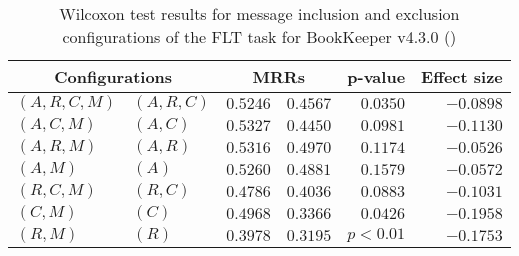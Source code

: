 
\begin{table}
\begin{spacing}{1.2}
\centering
\caption{Wilcoxon test results for message inclusion and exclusion configurations of the FLT task for BookKeeper v4.3.0 (\ctwo)}
\label{table:versus-wilcox-bookkeeper-flt-message}
\begin{tabular}{ll|rr|rr}
\toprule
      \multicolumn{2}{c|}{Configurations} &                \multicolumn{2}{c|}{MRRs} &        p-value & Effect size \\
\midrule
 $(A,R,C,M)$ &  $(A,R,C)$ &  $\bm{0.5246}$ &  $0.4567$ & $0.0350$ &   $-0.0898$ \\
   $(A,C,M)$ &    $(A,C)$ &  $\bm{0.5327}$ &  $0.4450$ & $0.0981$ &   $-0.1130$ \\
   $(A,R,M)$ &    $(A,R)$ &  $\bm{0.5316}$ &  $0.4970$ & $0.1174$ &   $-0.0526$ \\
     $(A,M)$ &      $(A)$ &  $\bm{0.5260}$ &  $0.4881$ & $0.1579$ &   $-0.0572$ \\
   $(R,C,M)$ &    $(R,C)$ &  $\bm{0.4786}$ &  $0.4036$ & $0.0883$ &   $-0.1031$ \\
     $(C,M)$ &      $(C)$ &  $\bm{0.4968}$ &  $0.3366$ & $0.0426$ &   $-0.1958$ \\
     $(R,M)$ &      $(R)$ &  $\bm{0.3978}$ &  $0.3195$ & $p<0.01$ &   $-0.1753$ \\
\bottomrule
\end{tabular}

\end{spacing}
\end{table}

